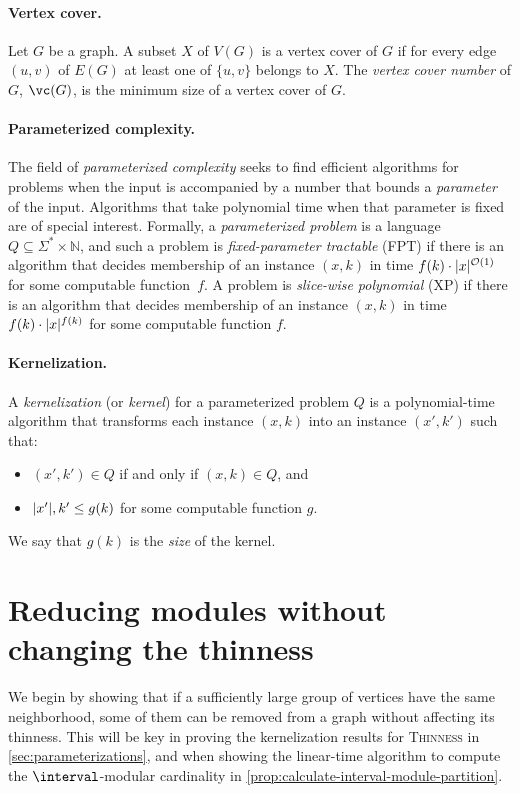 \documentclass[11pt]{article}
\theoremstyle{plain}
\theoremstyle{definition}
\theoremstyle{remark}
\renewcommand{\O}{\mathcal{O}}
\newcommand{\N}{\mathbb{N}}
\newcommand{\FPT}{{\smaller[0.83]\textsf{\textup{FPT}}}\xspace}
\newcommand{\XP}{{\smaller[0.83]\textsf{\textup{XP}}}\xspace}
\DeclarePairedDelimiter\abs{\lvert}{\rvert}
\begin{document}
\paragraph{Vertex cover.} Let $G$ be a graph. A subset $X$ of $V(G)$ is a vertex cover of $G$ if for every edge $(u, v)$ of $E(G)$ at least one of $\{u, v\}$ belongs to $X$. The \emph{vertex cover number} of $G$, $\vc(G)$, is the minimum size of a vertex cover of $G$. 

\paragraph{Parameterized complexity.} The field of \emph{parameterized complexity} seeks to find efficient algorithms for problems when the input is accompanied by a number that bounds a \emph{parameter} of the input. Algorithms that take polynomial time when that parameter is fixed are of special interest. Formally, a \emph{parameterized problem} is a language $Q \subseteq \Sigma^* \times \N$, and such a problem is \emph{fixed-parameter tractable} (\FPT) if there is an algorithm that decides membership of an instance $(x, k)$ in time $f(k)\cdot\abs{x}^{\O(1)}$ for some computable function~$f$. A problem is \emph{slice-wise polynomial} (\XP) if there is an algorithm that decides membership of an instance $(x, k)$ in time $f(k)\cdot \abs{x}^{f(k)}$ for some computable function $f$.

\paragraph{Kernelization.} A \emph{kernelization} (or \emph{kernel}) for a parameterized problem $Q$ is a po\-ly\-no\-mial-time algorithm that transforms each instance $(x, k)$ into an instance $(x', k')$ such that:
\begin{itemize}
\item $(x', k') \in Q$ if and only if $(x,k) \in Q$, and
\item $\abs{x'}, k' \leq g(k)$ for some computable function $g$.
\end{itemize}
We say that $g(k)$ is the \emph{size} of the kernel.

\section{Reducing modules without changing the thinness}
\label{sec:reducing-modules}

We begin by showing that if a sufficiently large group of vertices have the same neighborhood, some of them can be removed from a graph without affecting its thinness. This will be key in proving the kernelization results for \textsc{Thinness} in \cref{sec:parameterizations}, and when showing the linear-time algorithm to compute the $\interval$-modular cardinality in \cref{prop:calculate-interval-module-partition}.
\end{document}
